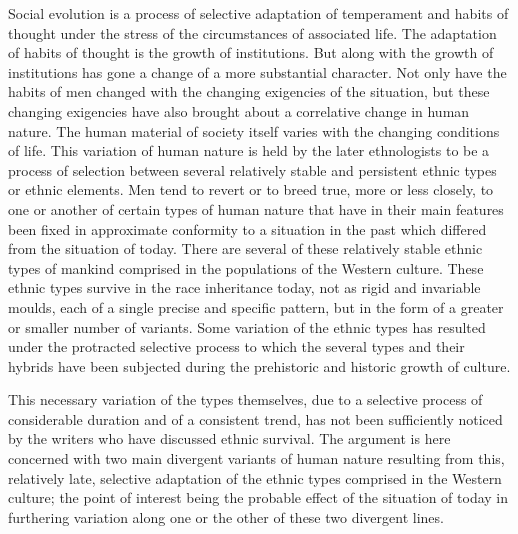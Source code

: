 \documentclass[12pt]{report}
\begin{document}
Social evolution is a process of selective adaptation of temperament and
habits of thought under the stress of the circumstances of associated
life. The adaptation of habits of thought is the growth of institutions.
But along with the growth of institutions has gone a change of a more
substantial character. Not only have the habits of men changed with the
changing exigencies of the situation, but these changing exigencies
have also brought about a correlative change in human nature. The human
material of society itself varies with the changing conditions of life.
This variation of human nature is held by the later ethnologists to be
a process of selection between several relatively stable and persistent
ethnic types or ethnic elements. Men tend to revert or to breed true,
more or less closely, to one or another of certain types of human nature
that have in their main features been fixed in approximate conformity
to a situation in the past which differed from the situation of today.
There are several of these relatively stable ethnic types of mankind
comprised in the populations of the Western culture. These ethnic types
survive in the race inheritance today, not as rigid and invariable
moulds, each of a single precise and specific pattern, but in the form
of a greater or smaller number of variants. Some variation of the ethnic
types has resulted under the protracted selective process to which
the several types and their hybrids have been subjected during the
prehistoric and historic growth of culture.

This necessary variation of the types themselves, due to a selective
process of considerable duration and of a consistent trend, has not been
sufficiently noticed by the writers who have discussed ethnic survival.
The argument is here concerned with two main divergent variants of human
nature resulting from this, relatively late, selective adaptation of
the ethnic types comprised in the Western culture; the point of interest
being the probable effect of the situation of today in furthering
variation along one or the other of these two divergent lines.
\end{document}
